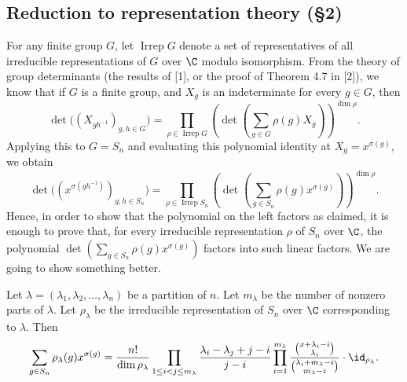 \subsection*{Reduction to representation theory (\S2)}
For any finite group $G$, let $\operatorname{Irrep}G$ denote a set of representatives of all irreducible representations of $G$ over $\C$ modulo isomorphism. From the theory of group determinants (the results of [1], or the proof of Theorem 4.7 in [2]), we know that if $G$ is a finite group, and $X_g$ is an indeterminate for every $g\in G$, then
\[
\det\bigl((X_{gh^{-1}})_{g,h\in G}\bigr)
=\prod_{\rho\in\operatorname{Irrep}G}
\left(\det\left(\sum_{g\in G}\rho(g)X_g\right)\right)^{\dim\rho}.
\]
Applying this to $G=S_n$ and evaluating this polynomial identity at $X_g=x^{\sigma(g)}$, we obtain
\begin{equation}\label{gr:groupdet}
\det\bigl((x^{\sigma(gh^{-1})})_{g,h\in S_n}\bigr)
=\prod_{\rho\in\operatorname{Irrep}S_n}
\left(\det\left(\sum_{g\in S_n}\rho(g)x^{\sigma(g)}\right)\right)^{\dim\rho}.
\end{equation}
Hence, in order to show that the polynomial on the left factors as claimed, it is enough to prove that, for every irreducible representation $\rho$ of $S_n$ over $\C$, the polynomial $\det(\sum_{g\in S_n}\rho(g)x^{\sigma(g)})$ factors into such linear factors. We are going to show something better.
\begin{theorem}[2]
Let $\lambda=(\lambda_1,\lambda_2,\ldots,\lambda_n)$ be a partition of $n$. Let $m_\lambda$ be the number of nonzero parts of $\lambda$. Let $\rho_\lambda$ be the irreducible representation of $S_n$ over $\C$ corresponding to $\lambda$. Then
\begin{equation}\label{gr:scalar}
\sum_{g\in S_n}\rho_\lambda(g)x^{\sigma(g)}
=\frac{n!}{\dim\rho_\lambda}
\prod_{1\le i<j\le m_\lambda}\frac{\lambda_i-\lambda_j+j-i}{j-i}
\prod_{i=1}^{m_\lambda}
\frac{\binom{x+\lambda_i-i}{\lambda_i}}
{\binom{\lambda_i+m_\lambda-i}{m_\lambda-i}}
\cdot\id_{\rho_\lambda}.
\end{equation}
\end{theorem}
